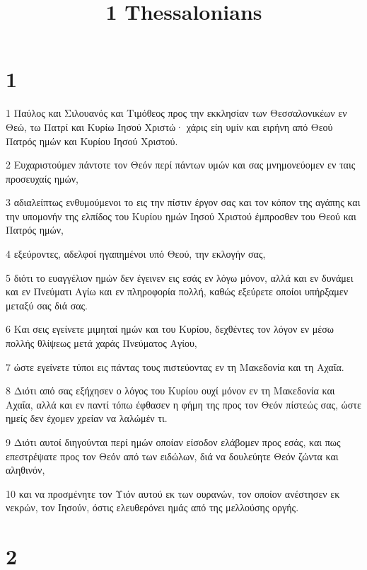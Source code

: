 

\title{1 Thessalonians}


\chapter{1}

\par 1 Παύλος και Σιλουανός και Τιμόθεος προς την εκκλησίαν των Θεσσαλονικέων εν Θεώ, τω Πατρί και Κυρίω Ιησού Χριστώ· χάρις είη υμίν και ειρήνη από Θεού Πατρός ημών και Κυρίου Ιησού Χριστού.
\par 2 Ευχαριστούμεν πάντοτε τον Θεόν περί πάντων υμών και σας μνημονεύομεν εν ταις προσευχαίς ημών,
\par 3 αδιαλείπτως ενθυμούμενοι το εις την πίστιν έργον σας και τον κόπον της αγάπης και την υπομονήν της ελπίδος του Κυρίου ημών Ιησού Χριστού έμπροσθεν του Θεού και Πατρός ημών,
\par 4 εξεύροντες, αδελφοί ηγαπημένοι υπό Θεού, την εκλογήν σας,
\par 5 διότι το ευαγγέλιον ημών δεν έγεινεν εις εσάς εν λόγω μόνον, αλλά και εν δυνάμει και εν Πνεύματι Αγίω και εν πληροφορία πολλή, καθώς εξεύρετε οποίοι υπήρξαμεν μεταξύ σας διά σας.
\par 6 Και σεις εγείνετε μιμηταί ημών και του Κυρίου, δεχθέντες τον λόγον εν μέσω πολλής θλίψεως μετά χαράς Πνεύματος Αγίου,
\par 7 ώστε εγείνετε τύποι εις πάντας τους πιστεύοντας εν τη Μακεδονία και τη Αχαΐα.
\par 8 Διότι από σας εξήχησεν ο λόγος του Κυρίου ουχί μόνον εν τη Μακεδονία και Αχαΐα, αλλά και εν παντί τόπω έφθασεν η φήμη της προς τον Θεόν πίστεώς σας, ώστε ημείς δεν έχομεν χρείαν να λαλώμέν τι.
\par 9 Διότι αυτοί διηγούνται περί ημών οποίαν είσοδον ελάβομεν προς εσάς, και πως επεστρέψατε προς τον Θεόν από των ειδώλων, διά να δουλεύητε Θεόν ζώντα και αληθινόν,
\par 10 και να προσμένητε τον Υιόν αυτού εκ των ουρανών, τον οποίον ανέστησεν εκ νεκρών, τον Ιησούν, όστις ελευθερόνει ημάς από της μελλούσης οργής.

\chapter{2}


